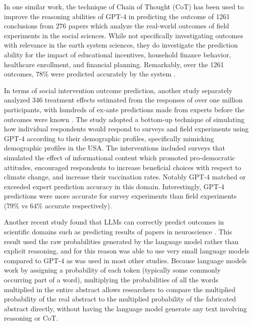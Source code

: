 \documentclass[12pt,a4paper]{article}
\begin{document}
In one similar work, the technique of Chain of Thought (CoT) has been used to improve the reasoning abilities of GPT-4 in predicting the outcome of 1261 conclusions from 276 papers which analyze the real-world outcomes of field experiments in the social sciences. While not specifically investigating outcomes with relevance in the earth system sciences, they do investigate the prediction ability for the impact of educational incentives, household finance behavior, healthcare enrollment, and financial planning. Remarkably, over the 1261 outcomes, 78\% were predicted accurately by the system .

In terms of social intervention outcome prediction, another study separately analyzed 346 treatment effects estimated from the responses of over one million participants, with hundreds of ex-ante predictions made from experts before the outcomes were known . The study adopted a bottom-up technique of simulating how individual respondents would respond to surveys and field experiments using GPT-4 according to their demographic profiles, specifically mimicking demographic profiles in the USA. The interventions included surveys that simulated the effect of informational content which promoted pro-democratic attitudes, encouraged respondents to increase beneficial choices with respect to climate change, and increase their vaccination rates. Notably GPT-4 matched or exceeded expert prediction accuracy in this domain. Interestingly, GPT-4 predictions were more accurate for survey experiments than field experiments (79\% vs 64\% accurate respectively). 

Another recent study found that LLMs can correctly predict outcomes in scientific domains such as predicting results of papers in neuroscience . This result used the raw probabilities generated by the language model rather than explicit reasoning, and for this reason was able to use very small language models compared to GPT-4 as was used in most other studies. Because language models work by assigning a probability of each token (typically some commonly occurring part of a word),  multiplying the probabilities of all the words multiplied in the entire abstract allows researchers to compare the multiplied probability of the real abstract to the multiplied probability of the fabricated abstract directly, without having the language model generate any text involving reasoning or CoT. 
\end{document}
